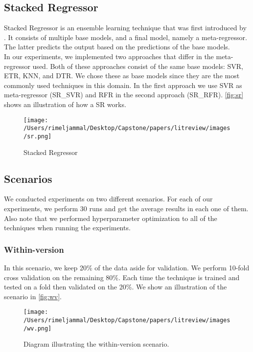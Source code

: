 \documentclass[]{article}
\begin{document}
	\subsection{Stacked Regressor}
	Stacked Regressor is an ensemble learning technique that was first introduced by \cite{wolpert1992stacked}. It consists of multiple base models, and a final model, namely a meta-regressor. The latter predicts the output based on the predictions of the base models.\\
	In our experiments, we implemented two approaches that differ in the meta-regressor used. Both of these approaches consist of the same base models: SVR, ETR, KNN, and DTR. We chose these as base models since they are the most commonly used techniques in this domain.  In the first approach we use SVR as meta-regressor (SR\_SVR) and RFR in the second approach (SR\_RFR). \autoref{fig:sr} shows an illustration of how a SR works.\\
	
	\FloatBarrier
	\begin{figure}[h]
		\centerline{\texttt{[image: /Users/rimeljammal/Desktop/Capstone/papers/litreview/images/sr.png]}}
		\caption{Stacked Regressor}\label{fig:sr}
	\end{figure}
	\FloatBarrier
	
	\break
	
	\subsection{Scenarios}
	We conducted experiments on two different scenarios. For each of our experiments, we perform 30 runs and get the average results in each one of them.\\
	Also note that we performed hyperparameter optimization to all of the techniques when running the experiments. 
	\subsubsection{Within-version}
	In this scenario, we keep 20\% of the data aside for validation. We perform 10-fold cross validation on the remaining 80\%. Each time the technique is trained and tested on a fold then validated on the 20\%. We show an illustration of the scenario in \autoref{fig:wv}.
	\FloatBarrier
	\begin{figure}[h]
		\centerline{\texttt{[image: /Users/rimeljammal/Desktop/Capstone/papers/litreview/images/wv.png]}}
		\caption{Diagram illustrating the within-version scenario.}\label{fig:wv}
	\end{figure}
	\FloatBarrier
\end{document}
